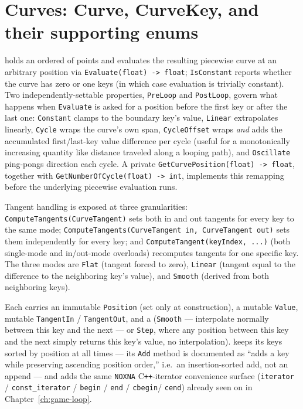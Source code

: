 \section{Curves: Curve, CurveKey, and their supporting enums}

 holds an ordered  of  points
and evaluates the resulting piecewise curve at an arbitrary position via
\texttt{Evaluate(float) -> float}; \texttt{IsConstant} reports whether the curve has zero or
one keys (in which case evaluation is trivially constant). Two independently-settable
 properties, \texttt{PreLoop} and \texttt{PostLoop}, govern what
happens when \texttt{Evaluate} is asked for a position before the first key or after the
last one: \texttt{Constant} clamps to the boundary key's value, \texttt{Linear} extrapolates
linearly, \texttt{Cycle} wraps the curve's own span, \texttt{CycleOffset} wraps \emph{and}
adds the accumulated first/last-key value difference per cycle (useful for a monotonically
increasing quantity like distance traveled along a looping path), and \texttt{Oscillate}
ping-pongs direction each cycle. A private \texttt{GetCurvePosition(float) -> float},
together with \texttt{GetNumberOfCycle(float) -> int}, implements this remapping before the
underlying piecewise evaluation runs.

Tangent handling is exposed at three granularities: \texttt{ComputeTangents(CurveTangent)}
sets both in and out tangents for every key to the same  mode;
\texttt{ComputeTangents(CurveTangent in, CurveTangent out)} sets them independently for every
key; and \texttt{ComputeTangent(keyIndex, ...)} (both single-mode and in/out-mode overloads)
recomputes tangents for one specific key. The three  modes are
\texttt{Flat} (tangent forced to zero), \texttt{Linear} (tangent equal to the difference to
the neighboring key's value), and \texttt{Smooth} (derived from both neighboring keys).

Each  carries an immutable \texttt{Position} (set only at construction),
a mutable \texttt{Value}, mutable \texttt{TangentIn} / \texttt{TangentOut}, and a
 (\texttt{Smooth} --- interpolate normally between this key and the
next --- or \texttt{Step}, where any position between this key and the next simply returns
this key's value, no interpolation).  keeps its keys sorted by
position at all times --- its \texttt{Add} method is documented as ``adds a key while
preserving ascending position order,'' i.e.\ an insertion-sorted add, not an append --- and
adds the same \texttt{NOXNA} C\texttt{++}-iterator convenience surface
(\texttt{iterator} / \texttt{const\_iterator} / \texttt{begin} / \texttt{end} / \texttt{cbegin}/%
\texttt{cend}) already seen on  in
Chapter~\ref{ch:game-loop}.

